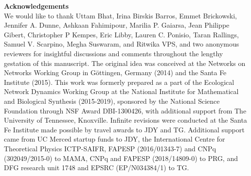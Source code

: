 \documentclass[twocolumn,preprintnumbers,amsmath,amssymb,superscriptaddress,linenumbers]{revtex4-1}
\begin{document}
% 
% 
% 
% 
% 
% 


\vspace{2mm}
\noindent \textbf{Acknowledgements}\\
  \footnotesize{
  We would like to thank
  Uttam Bhat,
  Irina Birskis Barros,
  Emmet Brickowski,
  Jennifer A. Dunne,
  Ashkaan Fahimipour,
  Marilia P. Gaiarsa,
  Jean Philippe Gibert,
  Christopher P Kempes,
  Eric Libby,
  Lauren C. Ponisio,
  Taran Rallings,
  Samuel V. Scarpino,
  Megha Suswaram,
  and Ritwika VPS,
  and two anonymous reviewers
  for insightful discussions and comments throughout the lengthy gestation of this manuscript.
  The original idea was conceived at the Networks on Networks Working Group in G\"ottingen, Germany (2014) and the Santa Fe Institute (2015).
  This work was formerly prepared as a part of the Ecological Network Dynamics Working Group at the National Institute for Mathematical and Biological Synthesis (2015-2019), sponsored by the National Science Foundation through NSF Award DBI-1300426, with additional support from The University of Tennessee, Knoxville.
  Infinite revisions were conducted at the Santa Fe Institute made possible by travel awards to JDY and TG.
  Additional support came from UC Merced startup funds to JDY, the International Centre for Theoretical Physics ICTP-SAIFR, FAPESP (2016/01343-7) and CNPq (302049/2015-0) to MAMA, CNPq and FAPESP (2018/14809-0) to PRG, and DFG research unit 1748 and EPSRC (EP/N034384/1) to TG.
  }\\ \\
  
\end{document}
